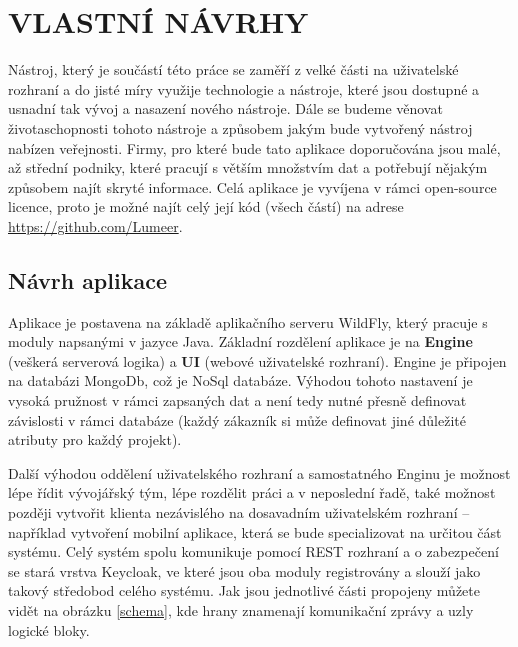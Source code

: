 \chapter{VLASTNÍ NÁVRHY}
\par Nástroj, který je součástí této práce se zaměří z velké části na uživatelské rozhraní a do jisté míry využije technologie a nástroje, které jsou dostupné a usnadní tak vývoj a nasazení nového nástroje. Dále se budeme věnovat  životaschopnosti tohoto nástroje a způsobem jakým bude vytvořený nástroj nabízen veřejnosti. Firmy, pro které bude tato aplikace doporučována jsou malé, až střední podniky, které pracují s větším množstvím dat a potřebují nějakým způsobem najít skryté informace. Celá aplikace je vyvíjena v rámci open-source licence, proto je možné najít celý její kód (všech částí) na adrese \url{https://github.com/Lumeer}.

\section{Návrh aplikace}
\par Aplikace je postavena na základě aplikačního serveru WildFly, který pracuje s moduly napsanými v jazyce Java. Základní rozdělení aplikace je na \textbf{Engine} (veškerá serverová logika) a \textbf{UI} (webové uživatelské rozhraní). Engine je připojen na databázi MongoDb, což je NoSql databáze. Výhodou tohoto nastavení je vysoká pružnost v rámci zapsaných dat a není tedy nutné přesně definovat závislosti v rámci databáze (každý zákazník si může definovat jiné důležité atributy pro každý projekt).

\par Další výhodou oddělení uživatelského rozhraní a samostatného Enginu je možnost lépe řídit vývojářský tým, lépe rozdělit práci a v neposlední řadě, také možnost později vytvořit klienta nezávislého na dosavadním uživatelském rozhraní -- například vytvoření mobilní aplikace, která se bude specializovat na určitou část systému. Celý systém spolu komunikuje pomocí REST rozhraní a o zabezpečení se stará vrstva Keycloak, ve které jsou oba moduly registrovány a slouží jako takový středobod celého systému. Jak jsou jednotlivé části propojeny můžete vidět na obrázku \ref{schema}, kde hrany znamenají komunikační zprávy a uzly logické bloky.

